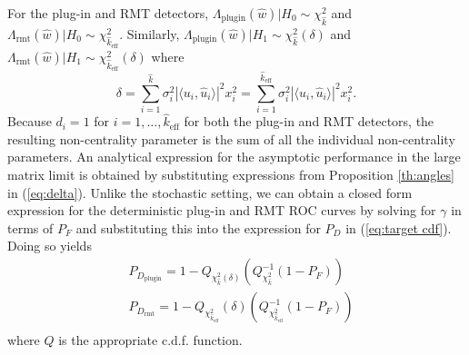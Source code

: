 For the plug-in and RMT detectors, $\Lambda_\text{plugin}(\widehat{w})|H_0\sim\chi_{\widehat{k}}^2$ and $\Lambda_\text{rmt}(\widehat{w})|H_0\sim\chi_{\widehat{k}_{\text{eff}}}^2$. Similarly, $\Lambda_\text{plugin}(\widehat{w})|H_1\sim\chi_{\widehat{k}}^2(\delta)$ and $\Lambda_\text{rmt}(\widehat{w})|H_1\sim\chi_{\widehat{k}_{\text{eff}}}^2(\delta)$ where
\begin{equation}\label{eq:delta}
\delta=\sum_{i=1}^{\widehat{k}}\sigma_i^2|\langle u_i,\widehat{u}_i\rangle|^2x_i^2=\sum_{i=1}^{\widehat{k}_{\text{eff}}}\sigma_i^2|\langle u_i,\widehat{u}_i\rangle|^2x_i^2.
 \end{equation}
Because $d_i=1$ for $i=1,\dots,\widehat{k}_{\text{eff}}$ for both the plug-in and RMT detectors, the resulting non-centrality parameter is the sum of all the individual non-centrality parameters. An analytical expression for the asymptotic performance in the large matrix limit  is obtained by substituting expressions from Proposition \ref{th:angles} in (\ref{eq:delta}). Unlike the stochastic setting, we can obtain a closed form expression for the deterministic plug-in and RMT ROC curves by solving for $\gamma$ in terms of $P_F$ and substituting this into the expression for $P_D$  in (\ref{eq:target cdf}). Doing so yields
\small\begin{equation}\label{eq:roc}
\begin{aligned}
&P_{D_\text{plugin}}=1-Q_{\chi_{\widehat{k}}^2(\delta)}\left(Q^{-1}_{\chi^2_{\widehat{k}}}\left(1-P_F\right)\right)\\
&P_{D_\text{rmt}}=1-Q_{\chi_{\widehat{k}_{\text{eff}}}^2}(\delta)\left(Q^{-1}_{\chi^2_{\widehat{k}_{\text{eff}}}}\left(1-P_F\right)\right)\\
\end{aligned}
\end{equation}\normalsize
where $Q$ is the appropriate c.d.f. function.
